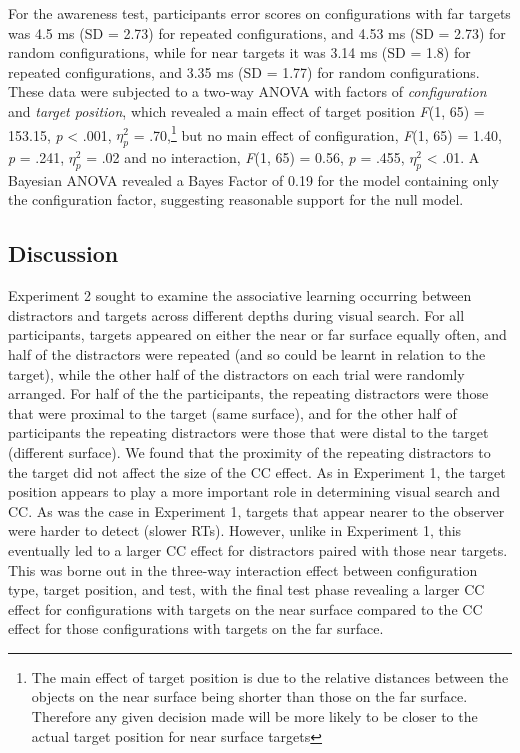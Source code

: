 \documentclass[
  english,
  man,floatsintext]{apa7}
\begin{document}
For the awareness test, participants error scores on configurations with far targets was 4.5 ms (SD = 2.73) for repeated configurations, and 4.53 ms (SD = 2.73) for random configurations, while for near targets it was 3.14 ms (SD = 1.8) for repeated configurations, and 3.35 ms (SD = 1.77) for random configurations. These data were subjected to a two-way ANOVA with factors of \emph{configuration} and \emph{target position}, which revealed a main effect of target position \emph{F}(1, 65) = 153.15, \emph{p} \textless{} .001, \(\eta^2_p\) = .70,\footnote{The main effect of target position is due to the relative distances between the objects on the near surface being shorter than those on the far surface. Therefore any given decision made will be more likely to be closer to the actual target position for near surface targets} but no main effect of configuration, \emph{F}(1, 65) = 1.40, \emph{p} = .241, \(\eta^2_p\) = .02 and no interaction, \emph{F}(1, 65) = 0.56, \emph{p} = .455, \(\eta^2_p\) \textless{} .01. A Bayesian ANOVA revealed a Bayes Factor of 0.19 for the model containing only the configuration factor, suggesting reasonable support for the null model.

\hypertarget{discussion-1}{%
\subsection{Discussion}\label{discussion-1}}

Experiment 2 sought to examine the associative learning occurring between distractors and targets across different depths during visual search. For all participants, targets appeared on either the near or far surface equally often, and half of the distractors were repeated (and so could be learnt in relation to the target), while the other half of the distractors on each trial were randomly arranged. For half of the the participants, the repeating distractors were those that were proximal to the target (same surface), and for the other half of participants the repeating distractors were those that were distal to the target (different surface). We found that the proximity of the repeating distractors to the target did not affect the size of the CC effect. As in Experiment 1, the target position appears to play a more important role in determining visual search and CC. As was the case in Experiment 1, targets that appear nearer to the observer were harder to detect (slower RTs). However, unlike in Experiment 1, this eventually led to a larger CC effect for distractors paired with those near targets. This was borne out in the three-way interaction effect between configuration type, target position, and test, with the final test phase revealing a larger CC effect for configurations with targets on the near surface compared to the CC effect for those configurations with targets on the far surface.
\end{document}
